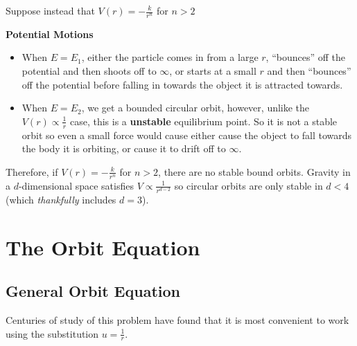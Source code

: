 \documentclass[../main.tex]{subfiles}
\begin{document}
Suppose instead that $V(r) = -\frac{k}{r^{n}}$ for $n > 2$
\begin{center}
\end{center}
\textbf{Potential Motions}
\begin{itemize}
  \item When $E = E_1$, either the particle comes in from a large $r$, ``bounces'' off the potential and then shoots off to $\infty$, or starts at a small $r$ and then ``bounces'' off the potential before falling in towards the object it is attracted towards.
  \item When $E = E_2$, we get a bounded circular orbit, however, unlike the $V(r) \propto \frac{1}{r}$ case, this is a \textbf{unstable} equilibrium point.
    So it is not a stable orbit so even a small force would cause either cause the object to fall towards the body it is orbiting, or cause it to drift off to $\infty$.
\end{itemize}
Therefore, if $V(r) = -\frac{k}{r^{n}}$ for $n > 2$, there are no stable bound orbits.
Gravity in a $d$-dimensional space satisfies $V \propto \frac{1}{r^{d - 2}}$ so circular orbits are only stable in $d < 4$ (which \textit{thankfully} includes $d = 3$).
\section{The Orbit Equation}
\subsection{General Orbit Equation}
Centuries of study of this problem have found that it is most convenient to work using the substitution $u = \frac{1}{r}$.
\end{document}
